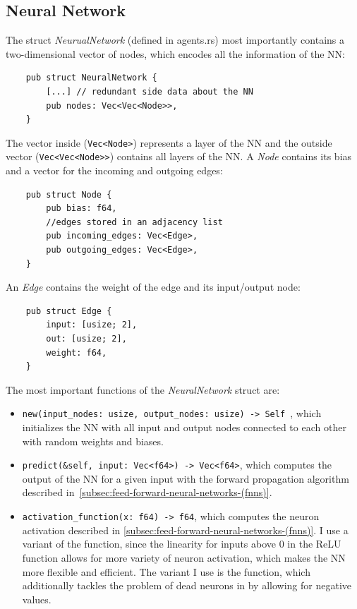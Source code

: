 \documentclass[11pt]{report}
\begin{document}
\begin{enumerate}
    \subsection{Neural Network}\label{subsec:neural-network}
    The struct \textit{NeurualNetwork} (defined in agents.rs) most importantly contains a two-dimensional vector of nodes, which encodes all the information of the NN\@:
    \begin{verbatim}
    pub struct NeuralNetwork {
        [...] // redundant side data about the NN
        pub nodes: Vec<Vec<Node>>,
    }
    \end{verbatim}
    The vector inside (\texttt{Vec<Node>}) represents a layer of the NN and the outside vector (\texttt{Vec<Vec<Node>>}) contains all layers of the NN\@.
    A \textit{Node} contains its bias and a vector for the incoming and outgoing edges:
    \begin{verbatim}
    pub struct Node {
        pub bias: f64,
        //edges stored in an adjacency list
        pub incoming_edges: Vec<Edge>,
        pub outgoing_edges: Vec<Edge>,
    }
    \end{verbatim}
    An \textit{Edge} contains the weight of the edge and its input/output node:
    \begin{verbatim}
    pub struct Edge {
        input: [usize; 2],
        out: [usize; 2],
        weight: f64,
    }
    \end{verbatim}
    The most important functions of the \textit{NeuralNetwork} struct are:
    \begin{itemize}
        \item \texttt{new(input_nodes: usize, output_nodes: usize) -> Self {}}, which initializes the NN with all input and output nodes connected to each other with random weights and biases.
        \item \texttt{predict(&self, input: Vec<f64>) -> Vec<f64>}, which computes the output of the NN for a given input with the forward propagation algorithm described in~\ref{subsec:feed-forward-neural-networks-(fnns)}.
        \item \texttt{activation_function(x: f64) -> f64}, which computes the neuron activation described in \ref{subsec:feed-forward-neural-networks-(fnns)}.
        I use a variant of the  function, since the linearity for inputs above 0 in the ReLU function allows for more variety of neuron activation, which makes the NN more flexible and efficient.
        The variant I use is the  function, which additionally tackles the problem of dead neurons in  by allowing for negative values.
    \end{itemize}


\end{enumerate}
\end{document}
